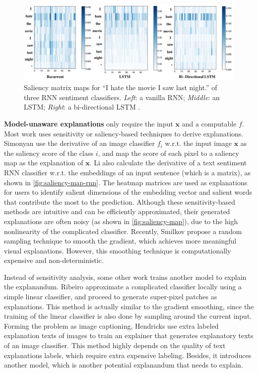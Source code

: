 \begin{figure}[tb]
  \centering
  \includegraphics[width=1.0\textwidth]{figure/saliency-map-rnn}
  \caption{Saliency matrix maps for ``I hate the movie I saw last night.'' of three RNN sentiment classifiers. \textit{Left}: a vanilla RNN; \textit{Middle}: an LSTM; \textit{Right}: a bi-directional LSTM \cite{simonyan14saliency}.}
  \label{fig:saliency-map-rnn}
\end{figure}

\textbf{Model-unaware explanations} only require the input $\mathbf{x}$ and a computable $f$. Most work uses sensitivity or saliency-based techniques to derive explanations. Simonyan \etal \cite{simonyan14saliency} use the derivative of an image classifier $f_i$ w.r.t. the input image $\mathbf{x}$ as the saliency score of the class $i$, and map the score of each pixel to a saliency map as the explanation of $\mathbf{x}$. Li \etal \cite{li2016naccl-hlt} also calculate the derivative of a text sentiment RNN classifier w.r.t. the embeddings of an input sentence (which is a matrix), as shown in \autoref{fig:saliency-map-rnn}. The heatmap matrices are used as explanations for users to identify salient dimensions of the embedding vector and salient words that contribute the most to the prediction. Although these sensitivity-based methods are intuitive and can be efficiently approximated, their generated explanations are often noisy (as shown in \autoref{fig:saliency-map}), due to the high nonlinearity of the complicated classifier. Recently, Smilkov \etal \cite{smilkov2017smoothgrad} propose a random sampling technique to smooth the gradient, which achieves more meaningful visual explanations. However, this smoothing technique is computationally expensive and non-deterministic.

Instead of sensitivity analysis, some other work trains another model to explain the explanandum. Ribeiro \etal \cite{ribeiro2016kdd} approximate a complicated classifier locally using a simple linear classifier, and proceed to generate super-pixel patches as explanations. This method is actually similar to the gradient smoothing, since the training of the linear classifier is also done by sampling around the current input. Forming the problem as image captioning, Hendricks \etal \cite{hendricks16generate} use extra labeled explanation texts of images to train an explainer that generates explanatory texts of an image classifier. This method highly depends on the quality of text explanations labels, which require extra expensive labeling. Besides, it introduces another model, which is another potential explanandum that needs to explain.

